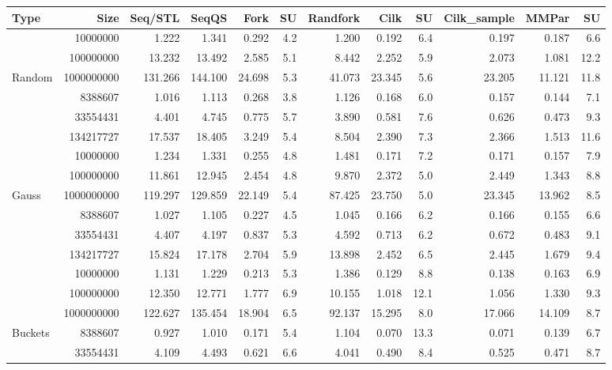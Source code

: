 \documentclass[preprint]{sigplanconf}
\begin{document}
\begin{table*}[t!]
\begin{center}
\begin{tabular}{|lr|rr|rrr|rrr||rr|}
\hline
Type & Size & Seq/STL & SeqQS & Fork & SU & Randfork & Cilk & SU & Cilk\_sample & MMPar & SU \\
\hline
 & 10000000 & 1.222 & 1.341 & 0.292 & 4.2 & 1.200 & 0.192 & 6.4 & 0.197 & 0.187 & 6.6 \\
 & 100000000 & 13.232 & 13.492 & 2.585 & 5.1 & 8.442 & 2.252 & 5.9 & 2.073 & 1.081 & 12.2 \\
Random & 1000000000 & 131.266 & 144.100 & 24.698 & 5.3 & 41.073 & 23.345 & 5.6 & 23.205 & 11.121 & 11.8 \\
 & 8388607 & 1.016 & 1.113 & 0.268 & 3.8 & 1.126 & 0.168 & 6.0 & 0.157 & 0.144 & 7.1 \\
 & 33554431 & 4.401 & 4.745 & 0.775 & 5.7 & 3.890 & 0.581 & 7.6 & 0.626 & 0.473 & 9.3 \\
 & 134217727 & 17.537 & 18.405 & 3.249 & 5.4 & 8.504 & 2.390 & 7.3 & 2.366 & 1.513 & 11.6 \\
\hline
 & 10000000 & 1.234 & 1.331 & 0.255 & 4.8 & 1.481 & 0.171 & 7.2 & 0.171 & 0.157 & 7.9 \\
 & 100000000 & 11.861 & 12.945 & 2.454 & 4.8 & 9.870 & 2.372 & 5.0 & 2.449 & 1.343 & 8.8 \\
Gauss & 1000000000 & 119.297 & 129.859 & 22.149 & 5.4 & 87.425 & 23.750 & 5.0 & 23.345 & 13.962 & 8.5 \\
 & 8388607 & 1.027 & 1.105 & 0.227 & 4.5 & 1.045 & 0.166 & 6.2 & 0.166 & 0.155 & 6.6 \\
 & 33554431 & 4.407 & 4.197 & 0.837 & 5.3 & 4.592 & 0.713 & 6.2 & 0.672 & 0.483 & 9.1 \\
 & 134217727 & 15.824 & 17.178 & 2.704 & 5.9 & 13.898 & 2.452 & 6.5 & 2.445 & 1.679 & 9.4 \\
\hline
 & 10000000 & 1.131 & 1.229 & 0.213 & 5.3 & 1.386 & 0.129 & 8.8 & 0.138 & 0.163 & 6.9 \\
 & 100000000 & 12.350 & 12.771 & 1.777 & 6.9 & 10.155 & 1.018 & 12.1 & 1.056 & 1.330 & 9.3 \\
 & 1000000000 & 122.627 & 135.454 & 18.904 & 6.5 & 92.137 & 15.295 & 8.0 & 17.066 & 14.109 & 8.7 \\
Buckets & 8388607 & 0.927 & 1.010 & 0.171 & 5.4 & 1.104 & 0.070 & 13.3 & 0.071 & 0.139 & 6.7 \\
 & 33554431 & 4.109 & 4.493 & 0.621 & 6.6 & 4.041 & 0.490 & 8.4 & 0.525 & 0.471 & 8.7 \\

\end{tabular}
\end{center}
\end{table*}
\end{document}
